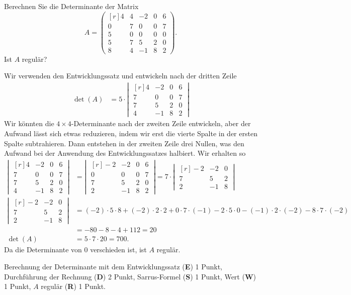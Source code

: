 Berechnen Sie die Determinante der Matrix
\[
A =
\begin{pmatrix*}[r]
   4 & 4 &-2 & 0 & 6\\
   0 & 7 & 0 & 0 & 7\\
   5 & 0 & 0 & 0 & 0\\
   5 & 7 & 5 & 2 & 0\\
   8 & 4 &-1 & 8 & 2
\end{pmatrix*}.
\]
Ist $A$ regulär?


\begin{loesung}
Wir verwenden den Entwicklungssatz und entwickeln nach der dritten Zeile
\begin{align*}
\det(A)
&=
5\cdot
\left|\;\begin{matrix*}[r]
  4 &-2 & 0 & 6\\
  7 & 0 & 0 & 7\\
  7 & 5 & 2 & 0\\
  4 &-1 & 8 & 2
\end{matrix*}\;\right|
\end{align*}
Wir könnten die $4\times 4$-Determinante nach der zweiten Zeile entwickeln,
aber der Aufwand lässt sich etwas reduzieren, indem wir erst die vierte Spalte
in der ersten Spalte subtrahieren. 
Dann entstehen in der zweiten Zeile drei Nullen, was den Aufwand bei
der Anwendung des Entwicklungssatzes halbiert.
Wir erhalten so
\begin{align*}
\left|\;\begin{matrix*}[r]
  4 &-2 & 0 & 6\\
  7 & 0 & 0 & 7\\
  7 & 5 & 2 & 0\\
  4 &-1 & 8 & 2
\end{matrix*}\;\right|
&=
\left|\;\begin{matrix*}[r]
 -2 &-2 & 0 & 6\\
  0 & 0 & 0 & 7\\
  7 & 5 & 2 & 0\\
  2 &-1 & 8 & 2
\end{matrix*}\;\right|
=
7\cdot
\left|\;\begin{matrix*}[r]
 -2 &-2 & 0\\
  7 & 5 & 2\\
  2 &-1 & 8
\end{matrix*}\;\right|
\\
\left|\;\begin{matrix*}[r]
 -2 &-2 & 0\\
  7 & 5 & 2\\
  2 &-1 & 8
\end{matrix*}\;\right|
&=
(-2)\cdot 5\cdot 8
+
(-2)\cdot 2 \cdot 2
+
0\cdot 7 \cdot (-1)
-
2\cdot 5\cdot 0
-
(-1)\cdot 2 \cdot (-2)
-
8\cdot 7\cdot (-2)
\\
&=
-80 -8-4+112
=
20
\\
\det(A)
&=
5\cdot 7 \cdot 20
= 
700.
\end{align*}
Da die Determinante von $0$ verschieden ist, ist $A$ regulär.
\end{loesung}

\begin{bewertung}
Berechnung der Determinante mit dem Entwicklungssatz ({\bf E}) 1 Punkt,
Durchführung der Rechnung ({\bf D}) 2 Punkt,
Sarrus-Formel ({\bf S}) 1 Punkt,
Wert ({\bf W}) 1 Punkt,
$A$ regulär ({\bf R}) 1 Punkt.
\end{bewertung}



